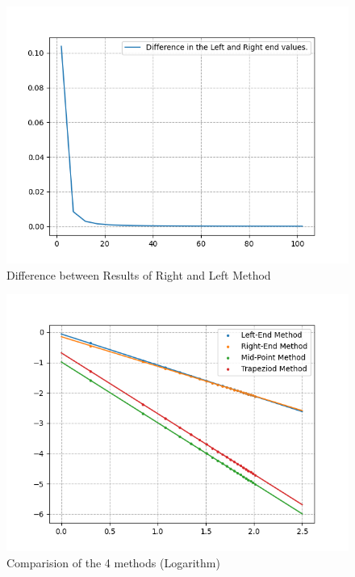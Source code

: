 \documentclass[12pt]{article}
\begin{document}
\begin{figure}[H]
    \centering
    \includegraphics[width=13cm]{diff.png}
    \caption{Difference between Results of Right and Left Method}
\end{figure}

\begin{figure}[H]
    \centering
    \includegraphics[width=13cm]{log4.png}
    \caption{Comparision of the 4 methods (Logarithm)}
\end{figure}

\end{document}
